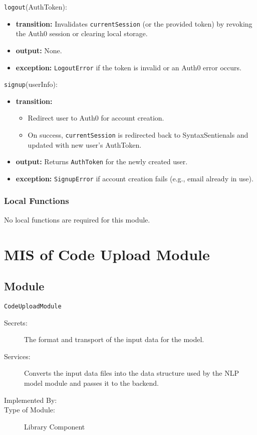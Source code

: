 \documentclass[12pt, titlepage]{article}
\begin{document}
\noindent \texttt{logout}(AuthToken):
\begin{itemize}
    \item \textbf{transition:} Invalidates \texttt{currentSession} (or the provided token) by revoking the Auth0 session or clearing local storage.
    \item \textbf{output:} None.
    \item \textbf{exception:} \texttt{LogoutError} if the token is invalid or an Auth0 error occurs.
\end{itemize}

\noindent \texttt{signup}(userInfo):
\begin{itemize}
    \item \textbf{transition:}
    \begin{itemize}
        \item Redirect user to Auth0 for account creation.
        \item On success, \texttt{currentSession} is redirected back to SyntaxSentienals and updated with new user’s AuthToken.
    \end{itemize}
    \item \textbf{output:} Returns \texttt{AuthToken} for the newly created user.
    \item \textbf{exception:} \texttt{SignupError} if account creation fails (e.g., email already in use).
\end{itemize}

\subsubsection{Local Functions}
No local functions are required for this module.

\section{MIS of Code Upload Module} \label{mCodeUpload}

\subsection{Module}

\texttt{CodeUploadModule}

\begin{description}
    \item[Secrets:] The format and transport of the input data for the model.
    \item[Services:] Converts the input data files into the data structure
    used by the NLP model module and passes it to the backend.
    \item[Implemented By:] \progname{}
    \item[Type of Module:] Library Component
\end{description}
\end{document}

